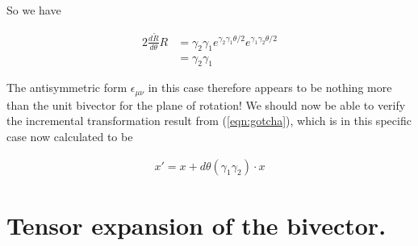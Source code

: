 \documentclass{article}
\begin{document}
So we have

\begin{align*}
2 \frac{d\tilde{R}}{d\theta} R 
&= \gamma_2 \gamma_1 e^{\gamma_2\gamma_1 \theta/2} e^{\gamma_1\gamma_2 \theta/2} \\
&= \gamma_2 \gamma_1 
\end{align*}

The antisymmetric form $\epsilon_{\mu\nu}$ in this case therefore appears to be nothing more than the unit bivector for the plane of rotation!  We should now be able to verify
the incremental transformation result from (\ref{eqn:gotcha}), which is in this specific case now calculated to be

\begin{align*}
x'= x + d\theta (\gamma_1 \gamma_2) \cdot x
\end{align*}

\section{Tensor expansion of the bivector.}



\end{document}
